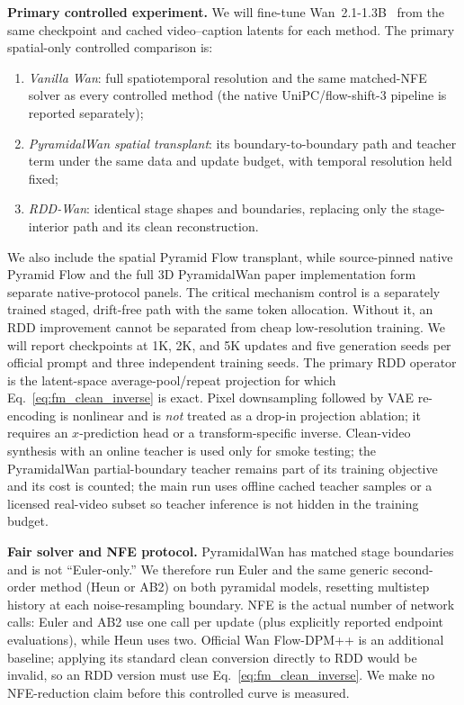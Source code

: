 \documentclass[10pt]{article}
\begin{document}
\textbf{Primary controlled experiment.}
We will fine-tune Wan~2.1-1.3B~\citep{wan2025wan} from the same checkpoint and cached video--caption latents for each method. The primary spatial-only controlled comparison is:
\begin{enumerate}
    \item \emph{Vanilla Wan}: full spatiotemporal resolution and the same matched-NFE solver as every controlled method (the native UniPC/flow-shift-3 pipeline is reported separately);
    \item \emph{PyramidalWan spatial transplant}: its boundary-to-boundary path and teacher term under the same data and update budget, with temporal resolution held fixed;
    \item \emph{RDD-Wan}: identical stage shapes and boundaries, replacing only the stage-interior path and its clean reconstruction.
\end{enumerate}
We also include the spatial Pyramid Flow transplant, while source-pinned native Pyramid Flow and the full 3D PyramidalWan paper implementation form separate native-protocol panels. The critical mechanism control is a separately trained staged, drift-free path with the same token allocation. Without it, an RDD improvement cannot be separated from cheap low-resolution training. We will report checkpoints at 1K, 2K, and 5K updates and five generation seeds per official prompt and three independent training seeds. The primary RDD operator is the latent-space average-pool/repeat projection for which Eq.~\eqref{eq:fm_clean_inverse} is exact. Pixel downsampling followed by VAE re-encoding is nonlinear and is \emph{not} treated as a drop-in projection ablation; it requires an $x$-prediction head or a transform-specific inverse. Clean-video synthesis with an online teacher is used only for smoke testing; the PyramidalWan partial-boundary teacher remains part of its training objective and its cost is counted; the main run uses offline cached teacher samples or a licensed real-video subset so teacher inference is not hidden in the training budget.

\textbf{Fair solver and NFE protocol.}
PyramidalWan has matched stage boundaries and is not ``Euler-only.'' We therefore run Euler and the same generic second-order method (Heun or AB2) on both pyramidal models, resetting multistep history at each noise-resampling boundary. NFE is the actual number of network calls: Euler and AB2 use one call per update (plus explicitly reported endpoint evaluations), while Heun uses two. Official Wan Flow-DPM++ is an additional baseline; applying its standard clean conversion directly to RDD would be invalid, so an RDD version must use Eq.~\eqref{eq:fm_clean_inverse}. We make no NFE-reduction claim before this controlled curve is measured.
\end{document}
